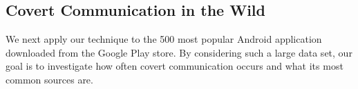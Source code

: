 \subsection{Covert Communication in the Wild}
We next apply our technique to the 500 most popular Android application
downloaded from the Google Play store. By considering such a large data set, our goal is to
investigate how often covert communication occurs and what its most common sources are.



